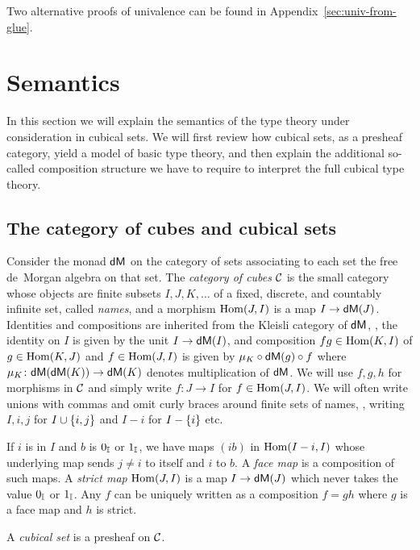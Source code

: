 Two alternative proofs of univalence can be found in
Appendix~\ref{sec:univ-from-glue}.

\section{Semantics}
\label{sec:semantics}

In this section we will explain the semantics of the type theory under
consideration in cubical sets. We will first review how cubical sets,
as a presheaf category, yield a model of basic type theory, and then
explain the additional so-called composition structure we have to
require to interpret the full cubical type theory.


\subsection{The category of cubes and cubical sets}
\label{sec:cubecat}

Consider the monad ${\sf dM}$ on the category of sets associating to each
set the free de~Morgan algebra on that set.  The \emph{category of
  cubes} $\mathcal{C}$ is the small category whose objects are finite subsets
$I,J,K,\dots$ of a fixed, discrete, and countably infinite set, called
\emph{names}, and a morphism $\operatorname{Hom}(J,I)$ is a map $I \to {\sf dM}(J)$.
Identities and compositions are inherited from the Kleisli category of
${\sf dM}$, \ie{}, the identity on $I$ is given by the unit $I \to {\sf dM}
(I)$, and composition $f g \in \operatorname{Hom} (K,I)$ of $g \in \operatorname{Hom}(K,J)$ and $f
\in \operatorname{Hom}(J,I)$ is given by $ \mu_K \circ {\sf dM} (g) \circ f$ where $\mu_K
\colon {\sf dM} ({\sf dM} (K)) \to {\sf dM} (K)$ denotes multiplication of ${\sf dM}$.  We
will use $f,g,h$ for morphisms in $\mathcal{C}$ and simply write $f \colon J
\to I$ for $f \in \operatorname{Hom}(J,I)$.  We will often write unions with commas
and omit curly braces around finite sets of names, \eg{}, writing
$I,i,j$ for $I \cup \{ i,j \}$ and $I-i$ for $I-\{ i \}$ etc.

If $i$ is in $I$ and $b$ is $0_{\mathbb{I}}$ or $1_{\mathbb{I}}$, we have maps $(ib)$ in
$\operatorname{Hom}(I-i,I)$ whose underlying map sends $j \neq i$ to itself and $i$
to $b$.  A \emph{face map} is a composition of such maps. A
\emph{strict map} $\operatorname{Hom}(J,I)$ is a map $I \to {\sf dM}(J)$ which never
takes the value $0_{\mathbb{I}}$ or $1_{\mathbb{I}}$. Any $f$ can be uniquely written as
a composition $f = gh$ where $g$ is a face map and $h$ is strict.

\begin{definition}
  \label{def:cset}
  A \emph{cubical set} is a presheaf on $\mathcal{C}$.
\end{definition}

